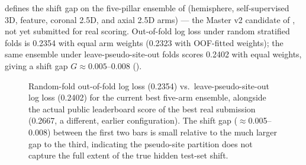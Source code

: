 \documentclass[11pt]{article}
\newcommand{\shiftgap}{\ensuremath{G}}
\begin{document}
 defines the shift gap on the five-pillar ensemble of  (hemisphere, self-supervised 3D, feature, coronal 2.5D, and axial 2.5D arms) --- the Master v2 candidate of , not yet submitted for real scoring. Out-of-fold log loss under random stratified folds is 0.2354 with equal arm weights (0.2323 with OOF-fitted weights); the same ensemble under leave-pseudo-site-out folds scores 0.2402 with equal weights, giving a shift gap $\shiftgap \approx 0.005$--$0.008$ ().

\begin{figure}[t]
\centering
{}
\caption{Random-fold out-of-fold log loss (0.2354) vs.\ leave-pseudo-site-out log loss (0.2402) for the current best five-arm ensemble, alongside the actual public leaderboard score of the best real submission (0.2667, a different, earlier configuration). The shift gap ($\approx$0.005--0.008) between the first two bars is small relative to the much larger gap to the third, indicating the pseudo-site partition does not capture the full extent of the true hidden test-set shift.}
\label{fig:shiftgap}
\end{figure}
\end{document}

